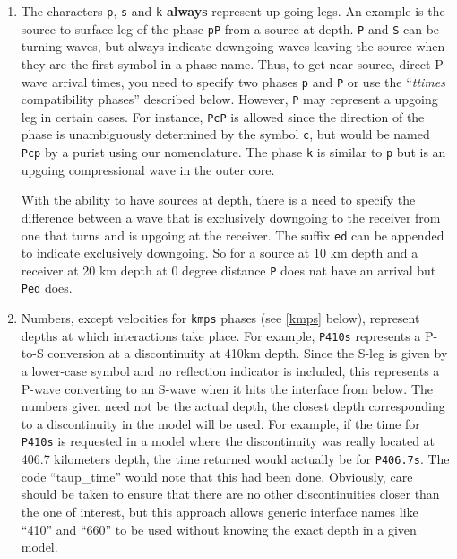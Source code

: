 \begin{enumerate}
\item \label{Ped} The characters \texttt{p}, \texttt{s} and \texttt{k} \textbf{always} represent
up-going legs.
An example is the source to surface leg of the phase \texttt{pP}
from a source at depth.
\texttt{P} and \texttt{S} can be turning waves, but
always indicate downgoing waves leaving the source when they are the first symbol in a
phase name.
Thus, to get near-source, direct P-wave arrival times, you need to specify two
phases \texttt{p} and \texttt{P} or use the ``\textit{ttimes} compatibility phases'' described
below.
However, \texttt{P} may
represent a upgoing leg in certain cases.
For instance, \texttt{PcP} is
allowed since the direction of the phase is unambiguously determined by the symbol
\texttt{c}, but would be named \texttt{Pcp} by a purist using our nomenclature. The phase
\texttt{k} is similar to \texttt{p} but is an upgoing compressional wave in the outer core.

With the ability to have sources at depth, there is a need to specify the difference between a wave that is
exclusively downgoing to the receiver from one that turns and is upgoing at the receiver. The suffix \texttt{ed}
can be appended to indicate exclusively downgoing. So for a source at 10 km depth and a receiver at 20 km depth
at 0 degree distance \texttt{P} does nat have an arrival but \texttt{Ped} does.

\item Numbers, except velocities for \texttt{kmps}
phases (see \ref{kmps} below),
represent depths at which interactions take place.
For example, \texttt{P410s} represents a P-to-S conversion at a discontinuity at 410km
depth.
Since the S-leg is given by a lower-case symbol and no reflection indicator is
included, this represents a P-wave  converting to an S-wave when it hits the interface
from below.
The numbers given need not be the actual depth, the closest depth corresponding to a
discontinuity in the model will be used.
For example, if the time for \texttt{P410s} is requested in a model where the discontinuity
was really located at 406.7 kilometers depth, the time returned would actually be for
\texttt{P406.7s}.
The code ``taup\_time'' would note that this had been done.
Obviously, care should be taken to ensure that there are no other discontinuities
closer than the one of interest, but this approach allows generic interface
names like ``410'' and ``660'' to be used without knowing the exact depth in a given
model.


\end{enumerate}
